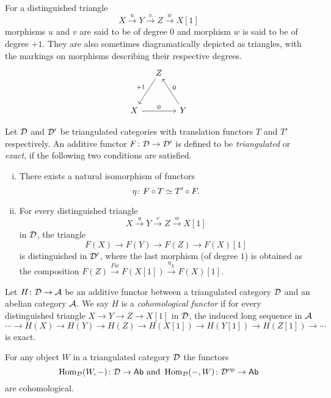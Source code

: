 \begin{remark}
    For a distinguished triangle
    \[
        X\xrightarrow{u} Y \xrightarrow{v} Z \xrightarrow{w} X[1]
    \]
    morphisms $u$ and $v$ are said to be of degree $0$ and morphism $w$ is said to be of degree $+1$. They are also sometimes diagramatically depicted as triangles, with the markings on morphisms describing their respective degrees.
    \[\begin{tikzcd}[column sep = small, row sep = 1.5em]
        & Z \\
        \\
        X && Y
        \arrow["{+1}"', from=1-2, to=3-1]
        \arrow["0", from=3-1, to=3-3]
        \arrow["0"', from=3-3, to=1-2]
    \end{tikzcd}\]
\end{remark}

\begin{definition}
    Let $\mathcal D$ and $\mathcal D'$ be triangulated categories with translation functors $T$ and $T'$ respectively. An additive functor $F \colon \mathcal D \to \mathcal D'$ is defined to be \emph{triangulated} or \emph{exact}, if the following two conditions are satisfied.
    \begin{enumerate}[(i)]
        \item There exists a natural isomorphism of functors 
        \[
            \eta \colon F \circ T \simeq T' \circ F.
        \]
        \item For every distinguished triangle
        \[
            X\xrightarrow{u} Y \xrightarrow{v} Z \xrightarrow{w} X[1]
        \]
        in $\mathcal D$, the triangle
        \[
            F(X) \to F(Y) \to F(Z) \to F(X)[1] 
        \]
        is distinguished in $\mathcal D'$, where the last morphism (of degree $1$) is obtained as the composition $F(Z) \xrightarrow{Fw} F(X[1]) \xrightarrow{\eta_X} F(X)[1]$.
    \end{enumerate}
\end{definition}

\begin{definition}
    Let $H\colon \mathcal D \to \mathcal A$ be an additive functor between a triangulated category $\mathcal D$ and an abelian category $\mathcal A$. We say $H$ is a \emph{cohomological functor} if for every distinguished triangle $X \to Y \to Z \to X[1]$ in $\mathcal D$, the induced long sequence in $\mathcal A$
    \[
        \cdots \to H(X) \to H(Y) \to H(Z) \to H(X[1]) \to H(Y[1]) \to H(Z[1]) \to \cdots
    \]
    is exact.
\end{definition}

\begin{example}
    For any object $W$ in a triangulated category $\mathcal D$ the functors 
    \[
    \operatorname{Hom}_\mathcal D(W, -) \colon \mathcal D \to \mathsf{Ab} \text{ and } \operatorname{Hom}_\mathcal D( - , W) \colon \mathcal D^{\text{op}} \to \mathsf{Ab}
    \]
    are cohomological.
\end{example}
